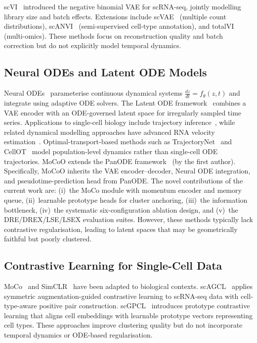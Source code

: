 \documentclass[biology,article,submit,pdftex]{Definitions/mdpi}
\begin{document}
scVI~\cite{lopez2018deep} introduced the negative binomial VAE for scRNA-seq, jointly modelling library size and batch effects. Extensions include scVAE~\cite{gronbech2020scvae} (multiple count distributions), scANVI~\cite{xu2021probabilistic} (semi-supervised cell-type annotation), and totalVI~\cite{gayoso2021joint} (multi-omics). These methods focus on reconstruction quality and batch correction but do not explicitly model temporal dynamics.

\subsection{Neural ODEs and Latent ODE Models}
\label{sec:related:ode}

Neural ODEs~\cite{chen2018neural} parameterise continuous dynamical systems $\frac{dz}{dt} = f_\theta(z, t)$ and integrate using adaptive ODE solvers. The Latent ODE framework~\cite{rubanova2019latent} combines a VAE encoder with an ODE-governed latent space for irregularly sampled time series. Applications to single-cell biology include trajectory inference~\cite{fu2025panode}, while related dynamical modelling approaches have advanced RNA velocity estimation~\cite{bergen2020generalizing}. Optimal-transport-based methods such as TrajectoryNet~\cite{tong2020trajectorynet} and CellOT~\cite{bunne2022cellot} model population-level dynamics rather than single-cell ODE trajectories. MoCoO extends the PanODE framework~\cite{fu2025panode} (by the first author). Specifically, MoCoO inherits the VAE encoder--decoder, Neural ODE integration, and pseudotime-prediction head from PanODE. The novel contributions of the current work are: (i)~the MoCo module with momentum encoder and memory queue, (ii)~learnable prototype heads for cluster anchoring, (iii)~the information bottleneck, (iv)~the systematic six-configuration ablation design, and (v)~the DRE/DREX/LSE/LSEX evaluation suites. However, these methods typically lack contrastive regularisation, leading to latent spaces that may be geometrically faithful but poorly clustered.

\subsection{Contrastive Learning for Single-Cell Data}
\label{sec:related:contrastive}

MoCo~\cite{he2020momentum} and SimCLR~\cite{chen2020simple} have been adapted to biological contexts. scAGCL~\cite{cai2024scagcl} applies symmetric augmentation-guided contrastive learning to scRNA-seq data with cell-type-aware positive pair construction. scGPCL~\cite{cai2024scgpcl} introduces prototype contrastive learning that aligns cell embeddings with learnable prototype vectors representing cell types. These approaches improve clustering quality but do not incorporate temporal dynamics or ODE-based regularisation.
\end{document}
